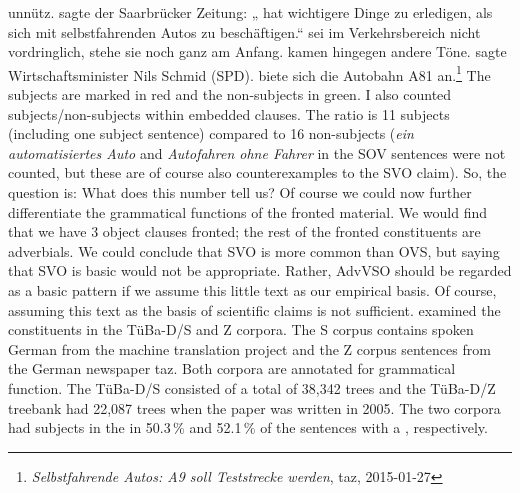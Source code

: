 unnütz.  sagte der Saarbrücker Zeitung: „ hat wichtigere Dinge zu erledigen, als sich mit selbstfahrenden Autos zu beschäftigen.“
 sei im Verkehrsbereich nicht vordringlich,  stehe sie noch ganz am
Anfang.  
kamen hingegen andere Töne.  sagte Wirtschaftsminister Nils Schmid (SPD).  biete sich die Autobahn A81 an.\footnote{\emph{Selbstfahrende Autos: A9 soll Teststrecke werden}, taz, 2015-01-27}
\z
\largerpage
The subjects are marked in red and the non-subjects in green. I also counted subjects/non-subjects
within embedded clauses. The ratio is 11 subjects (including one subject sentence) compared to 16
non-subjects (\emph{ein automatisiertes Auto} and \emph{Autofahren ohne Fahrer} in the SOV sentences were not counted, but these are
of course also counterexamples to the SVO claim). So, the question is: What does
this number tell us? Of course we could now further differentiate the grammatical functions of the
fronted material. We would find that we have 3 object clauses fronted; the rest of the fronted
constituents are adverbials. We could conclude that SVO is more common than OVS, but saying that SVO
is basic would not be appropriate. Rather, AdvVSO should be regarded as a basic pattern if we
assume this little text as our empirical basis. Of course, assuming this text as the basis of
scientific claims is not sufficient. 
\largerpage 
\citet[Section~4]{HK2005a} examined the \vf
constituents in the TüBa-D/S and Z corpora. The S corpus contains spoken German from the machine
translation project \verbmobil and the Z corpus sentences from the German newspaper taz. Both
corpora are annotated for grammatical function. The TüBa-D/S consisted of a total of 38,342 trees
and the TüBa-D/Z treebank had 22,087 trees when the paper was written in 2005. The two corpora had
subjects in the \vf in 50.3\,\% and 52.1\,\% of the sentences with a \vf, respectively. 
